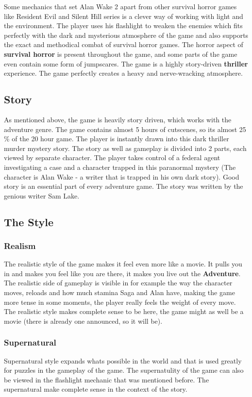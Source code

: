 \documentclass[a4paper,10pt,english]{article}
\begin{document}
Some mechanics that set Alan Wake 2 apart from other survival horror games like Resident Evil and Silent Hill series is a clever way of working with light and the environment. The player uses his flashlight to weaken the enemies which fits perfectly with the dark and mysterious atmosphere of the game and also supports the exact and methodical combat of survival horror games. The horror aspect of \textbf{survival horror} is present throughout the game, and some parts of the game even contain some form of jumpscares. The game is a highly story-driven \textbf{ thriller} experience. The game perfectly creates a heavy and nerve-wracking atmosphere. 

\subsection*{Story}
As mentioned above, the game is heavily story driven, which works with the adventure genre.
The game contains almost 5 hours of cutscenes, so its almost 25 \% of the 20 hour game.
The player is instantly drawn into this dark thriller murder mystery story. The story as well as gameplay is divided into 2 parts, each viewed by separate character. The player takes control of a federal agent investigating a case and a character trapped in this paranormal mystery (The character is Alan Wake - a writer that is trapped in his own dark story). Good story is an essential part of every adventure game. The story was written by the genious writer Sam Lake.

\subsection*{The Style}
\subsubsection*{Realism}
The realistic style of the game makes it feel even more like a movie. It pulls you in and makes you feel like you are there, it makes you live out the \textbf{Adventure}. The realistic side of gameplay is visible in for example the way the character moves, reloads and how much stamina Saga and Alan have, making the game more tense in some moments, the player really feels the weight of every move. The realistic style makes complete sense to be here, the game might as well be a movie (there is already one announced, so it will be).

\subsubsection*{Supernatural}
Supernatural style expands whats possible in the world and that is used greatly for puzzles in the gameplay of the game. The supernatulity of the game can also be viewed in the flashlight mechanic that was mentioned before. The supernatural make complete sense in the context of the story.
\end{document}
